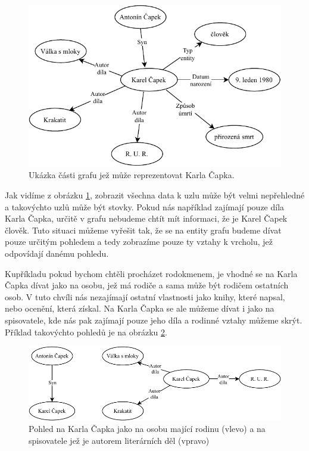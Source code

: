 \begin{figure}[h]
    \centering
    \includegraphics{media/capek-full.pdf}
    \caption{Ukázka části grafu jež může reprezentovat Karla Čapka.}
    \label{fig:capek-full}
\end{figure}

Jak vidíme z obrázku \ref{fig:capek-full}, zobrazit všechna data k uzlu může být velmi nepřehledné a takovýchto uzlů může být stovky. Pokud nás například zajímají pouze díla Karla Čapka, určitě v grafu nebudeme chtít mít informaci, že je Karel Čapek člověk. Tuto situaci můžeme vyřešit tak, že se na entity grafu budeme dívat pouze určitým pohledem a tedy zobrazíme pouze ty vztahy k vrcholu, jež odpovídají danému pohledu.

Kupříkladu pokud bychom chtěli procházet rodokmenem, je vhodné se na Karla Čapka dívat jako na osobu, jež má rodiče a sama může být rodičem ostatních osob. V tuto chvíli nás nezajímají ostatní vlastnosti jako knihy, které napsal, nebo ocenění, která získal. Na Karla Čapka se ale můžeme dívat i jako na spisovatele, kde nás pak zajímají pouze jeho díla a rodinné vztahy můžeme skrýt. Příklad takovýchto pohledů je na obrázku \ref{fig:capek-part}.

\begin{figure}[h]
    \centering
    \includegraphics{media/capek-part.pdf}
    \caption{Pohled na Karla Čapka jako na osobu mající rodinu (vlevo) a na spisovatele jež je autorem literárních děl (vpravo)}
    \label{fig:capek-part}
\end{figure}

